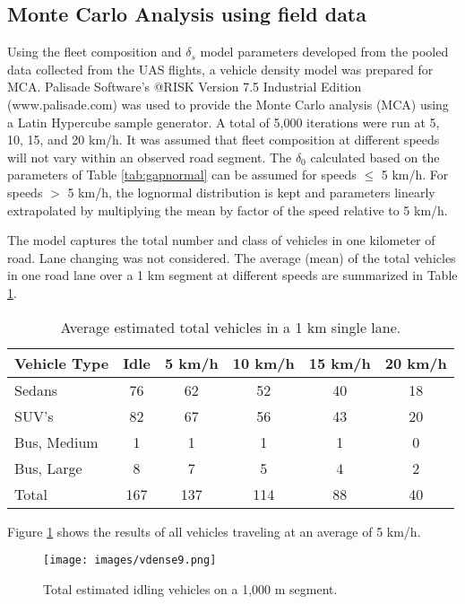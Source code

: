 \subsection{Monte Carlo Analysis using field data}
Using the fleet composition and $\delta_{s}$ model parameters developed from the pooled data collected from the UAS flights, a vehicle density model was prepared for MCA. Palisade Software’s @RISK Version 7.5 Industrial Edition (www.palisade.com) was used to provide the Monte Carlo analysis (MCA) using a Latin Hypercube sample generator.  A total of 5,000 iterations were run at 5, 10, 15, and 20 km/h. It was assumed that fleet composition at different speeds will not vary within an observed road segment. The $\delta_{0}$ calculated based on the parameters of Table \ref{tab:gapnormal} can be assumed for speeds $\leq$ 5 km/h. For speeds $>$ 5 km/h, the lognormal distribution is kept and parameters linearly extrapolated by multiplying the mean by factor of the speed relative to 5 km/h.  

The model captures the total number and class of vehicles in one kilometer of road.  Lane changing was not considered. The average (mean) of the total vehicles in one road lane over a 1 km segment at different speeds are summarized in Table \ref{tab:meanvehdensity}.

\begin{table}[H]
\centering
\caption{Average estimated total vehicles in a 1 km single lane.}
\label{tab:meanvehdensity}
\begin{tabular}{@{}lccccc@{}}
\toprule
\textbf{Vehicle Type} & \textbf{Idle} & \textbf{5 km/h} & \textbf{10 km/h} & \textbf{15 km/h} & \textbf{20 km/h} \\ \midrule
Sedans & 76 & 62 & 52 & 40 & 18 \\
SUV's & 82 & 67 & 56 & 43 & 20 \\
Bus, Medium & 1 & 1 & 1 & 1 & 0 \\
Bus, Large & 8 & 7 & 5 & 4 & 2 \\
Total & 167 & 137 & 114 & 88 & 40 \\ \bottomrule
\end{tabular}
\end{table}

Figure \ref{fig6:estimatedobs} shows the results of all vehicles traveling at an average of 5 km/h.
 
%
\begin{figure}[H]
\texttt{[image: images/vdense9.png]} 
\caption{Total estimated idling vehicles on a 1,000 m segment.}
\label{fig6:estimatedobs}
\end{figure}
%

